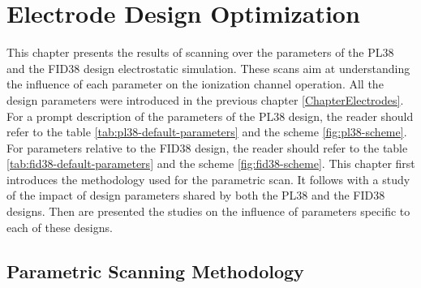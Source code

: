 
\chapter{Electrode Design Optimization} %

\label{ChapterElectrodesScan} %


This chapter presents the results of scanning over the parameters of the PL38 and the FID38 design electrostatic simulation. These scans aim at understanding the influence  of each parameter on the ionization channel operation. All the design parameters were introduced in the previous chapter \ref{ChapterElectrodes}. For a prompt description of the parameters of the PL38 design, the reader should refer to the table \ref{tab:pl38-default-parameters} and the scheme \ref{fig:pl38-scheme}. For parameters relative to the FID38 design, the reader should refer to the table \ref{tab:fid38-default-parameters} and the scheme \ref{fig:fid38-scheme}. 
This chapter first introduces the methodology used for the parametric scan. It follows with a study of the impact of design parameters shared by both the PL38 and the FID38 designs. Then are presented the studies on the influence of parameters specific to each of these designs.


\section{Parametric Scanning Methodology}

